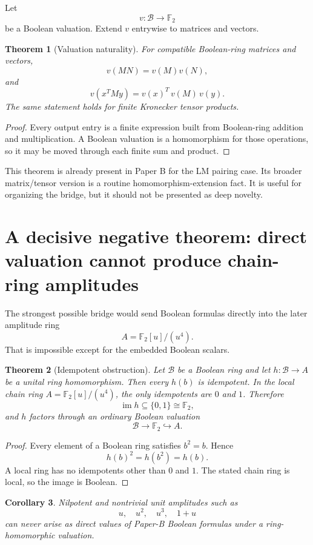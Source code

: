 \documentclass[11pt]{article}
\newtheorem{theorem}{Theorem}[section]
\newtheorem{corollary}[theorem]{Corollary}
\theoremstyle{definition}
\newcommand{\F}{\mathbb{F}}
\newcommand{\B}{\mathcal{B}}
\begin{document}
Let
\[
v:\B\longrightarrow\F_2
\]
be a Boolean valuation. Extend \(v\) entrywise to matrices and vectors.

\begin{theorem}[Valuation naturality]
For compatible Boolean-ring matrices and vectors,
\[
v(MN)=v(M)v(N),
\]
and
\[
v(x^TMy)=v(x)^T\,v(M)\,v(y).
\]
The same statement holds for finite Kronecker tensor products.
\end{theorem}

\begin{proof}
Every output entry is a finite expression built from Boolean-ring addition and multiplication. A
Boolean valuation is a homomorphism for those operations, so it may be moved through each finite
sum and product.
\end{proof}

This theorem is already present in Paper B for the LM pairing case. Its broader matrix/tensor version
is a routine homomorphism-extension fact. It is useful for organizing the bridge, but it should not be
presented as deep novelty.

\section{A decisive negative theorem: direct valuation cannot produce chain-ring amplitudes}

The strongest possible bridge would send Boolean formulas directly into the later amplitude ring
\[
A=\F_2[u]/(u^4).
\]
That is impossible except for the embedded Boolean scalars.

\begin{theorem}[Idempotent obstruction]
Let \(\B\) be a Boolean ring and let \(h:\B\to A\) be a unital ring homomorphism. Then every
\(h(b)\) is idempotent. In the local chain ring \(A=\F_2[u]/(u^4)\), the only idempotents are
\(0\) and \(1\). Therefore
\[
\operatorname{im}h\subseteq\{0,1\}\cong\F_2,
\]
and \(h\) factors through an ordinary Boolean valuation
\[
\B\longrightarrow\F_2\hookrightarrow A.
\]
\end{theorem}

\begin{proof}
Every element of a Boolean ring satisfies \(b^2=b\). Hence
\[
h(b)^2=h(b^2)=h(b).
\]
A local ring has no idempotents other than \(0\) and \(1\). The stated chain ring is local, so the
image is Boolean.
\end{proof}

\begin{corollary}
Nilpotent and nontrivial unit amplitudes such as
\[
u,\quad u^2,\quad u^3,\quad 1+u
\]
can never arise as direct values of Paper-B Boolean formulas under a ring-homomorphic valuation.
\end{corollary}
\end{document}
